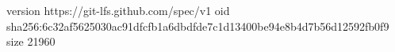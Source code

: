 version https://git-lfs.github.com/spec/v1
oid sha256:6c32af5625030ac91dfcfb1a6dbdfde7c1d13400be94e8b4d7b56d12592fb0f9
size 21960
